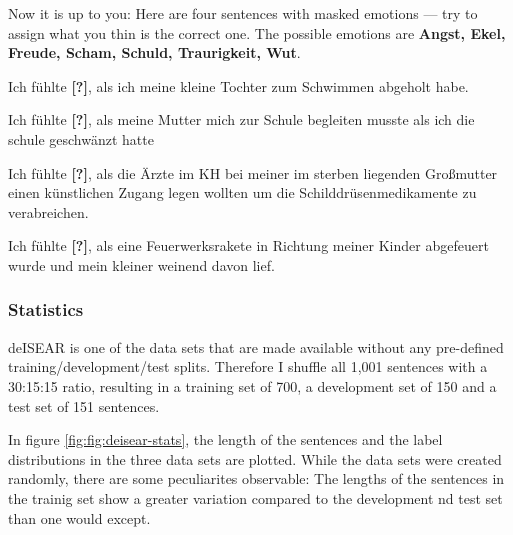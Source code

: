Now it is up to you: Here are four sentences with masked emotions --- try to assign what you thin is the correct one.
The possible emotions are \textbf{Angst, Ekel, Freude, Scham, Schuld, Traurigkeit, Wut}.


\begin{examples}
  \item \label{itm:deisear1} Ich fühlte \textbf{[?]}, als ich meine kleine Tochter zum Schwimmen abgeholt habe.
  \item \label{itm:deisear2} Ich fühlte \textbf{[?]}, als meine Mutter mich zur Schule begleiten musste als ich die schule geschwänzt hatte
  \item \label{itm:deisear3} Ich fühlte \textbf{[?]}, als die Ärzte im KH bei meiner im sterben liegenden Großmutter einen künstlichen Zugang legen wollten um die Schilddrüsenmedikamente zu verabreichen.
  \item \label{itm:deisear4} Ich fühlte \textbf{[?]}, als eine Feuerwerksrakete in Richtung meiner Kinder abgefeuert wurde und mein kleiner weinend davon lief.
\end{examples}



\subsubsection{Statistics}

deISEAR is one of the data sets that are made available without any pre-defined training/development/test splits.
Therefore I shuffle all 1,001 sentences with a 30:15:15 ratio, resulting in a training set of 700, a development set
of 150 and a test set of 151 sentences.

In figure \ref{fig:fig:deisear-stats}, the length of the sentences and the label distributions in the three data sets are
plotted. While the data sets were created randomly, there are some peculiarites observable: The lengths of the sentences
in the trainig set show a greater variation compared to the development nd test set than one would except.

